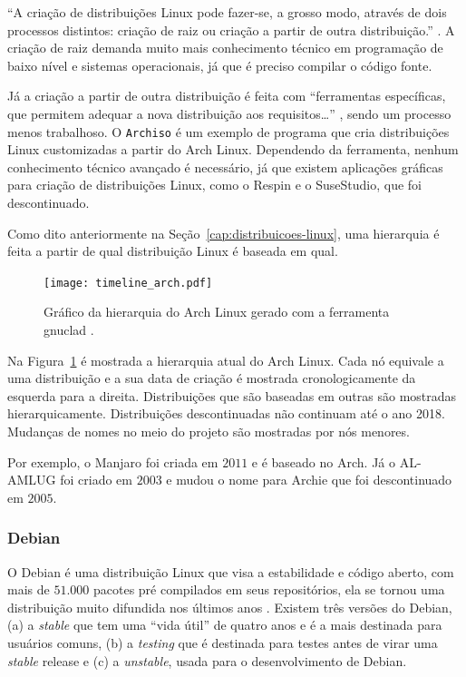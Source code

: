 \documentclass[
article,			%
12pt,				%
openright,			%
oneside,			%
a4paper,			%
chapter=TITLE,		%
section=TITLE,		%
subsection=TITLE,	%
subsubsection=TITLE,%
subsubsubsection=TITLE, %
english,			%
brazil,				%
]{abntex2}
\def\code#1{\texttt{#1}}
\begin{document}
``A criação  de  distribuições  Linux pode fazer-se, a grosso modo,
através  de  dois processos distintos: criação de raiz ou criação a
partir de outra distribuição.'' \cite[p.  78]{Nunes2009}. A criação de
raiz demanda muito mais conhecimento técnico em programação de baixo
nível e sistemas operacionais, já que é preciso compilar o código
fonte.

Já a criação a partir de outra distribuição é feita com ``ferramentas
específicas, que  permitem adequar  a  nova  distribuição  aos
requisitos\ldots'' \cite[p. 78]{Nunes2009}, sendo um processo menos
trabalhoso. O \code{Archiso} é um exemplo de programa que cria
distribuições Linux customizadas a partir do Arch Linux. Dependendo da
ferramenta, nenhum conhecimento técnico avançado é necessário, já que
existem aplicações gráficas para criação de distribuições Linux, como
o Respin \cite{Respin2018} e o SuseStudio, que foi descontinuado.

Como dito anteriormente na Seção~\ref{cap:distribuicoes-linux}, uma
hierarquia é feita a partir de qual distribuição Linux é baseada em
qual.

\begin{figure}[H]
    \caption{\label{fig:hierarquia-arch}Gráfico da hierarquia do Arch
    Linux gerado com a ferramenta gnuclad \cite{Loli2017}.}
    \begin{center}
        \texttt{[image: timeline\_arch.pdf]}
    \end{center}
\end{figure}

Na Figura~\ref{fig:hierarquia-arch} é mostrada a hierarquia atual do
Arch Linux. Cada nó equivale a uma distribuição e a sua data de
criação é mostrada cronologicamente da esquerda para a direita.
Distribuições que são baseadas em outras são mostradas
hierarquicamente. Distribuições descontinuadas não continuam até o ano
2018. Mudanças de nomes no meio do projeto são mostradas por nós
menores.

Por exemplo, o Manjaro foi criada em $2011$ e é baseado no Arch. Já o
AL-AMLUG foi criado em $2003$ e mudou o nome para Archie que foi
descontinuado em $2005$.

\subsubsection{Debian}

O Debian é uma distribuição Linux que visa a estabilidade e código
aberto, com mais de $51.000$ pacotes pré compilados em seus
repositórios, ela se tornou uma distribuição muito difundida nos
últimos anos \cite{Debian2018}. Existem três versões do Debian,
(a) a \emph{stable} que tem uma ``vida útil'' de quatro anos e é a
mais destinada para usuários comuns, (b) a \emph{testing} que é
destinada para testes antes de virar uma \emph{stable} release e (c) a
\emph{unstable}, usada para o desenvolvimento de Debian.
\end{document}
